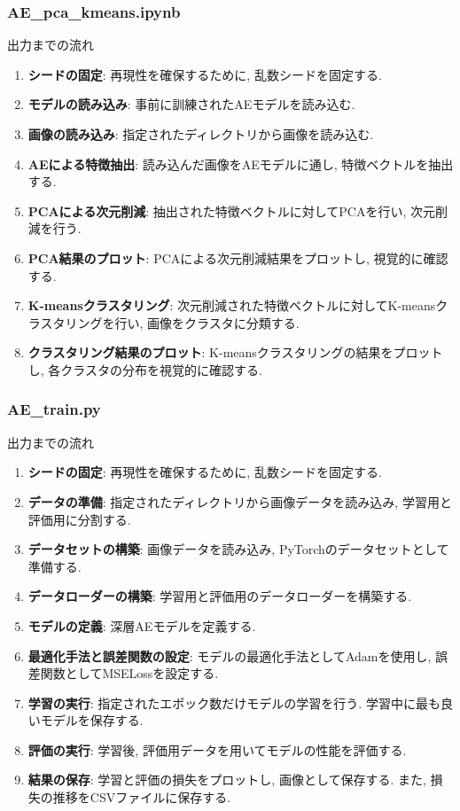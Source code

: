 \documentclass[a4paper, 12pt]{report}
\begin{document}
\subsubsection{\textbf{AE\_pca\_kmeans.ipynb}}

出力までの流れ
\begin{enumerate}
    \item \textbf{シードの固定}: 再現性を確保するために, 乱数シードを固定する. 
    \item \textbf{モデルの読み込み}: 事前に訓練されたAEモデルを読み込む. 
    \item \textbf{画像の読み込み}: 指定されたディレクトリから画像を読み込む. 
    \item \textbf{AEによる特徴抽出}: 読み込んだ画像をAEモデルに通し, 特徴ベクトルを抽出する. 
    \item \textbf{PCAによる次元削減}: 抽出された特徴ベクトルに対してPCAを行い, 次元削減を行う. 
    \item \textbf{PCA結果のプロット}: PCAによる次元削減結果をプロットし, 視覚的に確認する. 
    \item \textbf{K-meansクラスタリング}: 次元削減された特徴ベクトルに対してK-meansクラスタリングを行い, 画像をクラスタに分類する. 
    \item \textbf{クラスタリング結果のプロット}: K-meansクラスタリングの結果をプロットし, 各クラスタの分布を視覚的に確認する. 
\end{enumerate}

\subsubsection{\textbf{AE\_train.py}}

出力までの流れ
\begin{enumerate}
    \item \textbf{シードの固定}: 再現性を確保するために, 乱数シードを固定する. 
    \item \textbf{データの準備}: 指定されたディレクトリから画像データを読み込み, 学習用と評価用に分割する. 
    \item \textbf{データセットの構築}: 画像データを読み込み, PyTorchのデータセットとして準備する. 
    \item \textbf{データローダーの構築}: 学習用と評価用のデータローダーを構築する. 
    \item \textbf{モデルの定義}: 深層AEモデルを定義する. 
    \item \textbf{最適化手法と誤差関数の設定}: モデルの最適化手法としてAdamを使用し, 誤差関数としてMSELossを設定する. 
    \item \textbf{学習の実行}: 指定されたエポック数だけモデルの学習を行う. 学習中に最も良いモデルを保存する. 
    \item \textbf{評価の実行}: 学習後, 評価用データを用いてモデルの性能を評価する. 
    \item \textbf{結果の保存}: 学習と評価の損失をプロットし, 画像として保存する. また, 損失の推移をCSVファイルに保存する. 
\end{enumerate}
\end{document}
